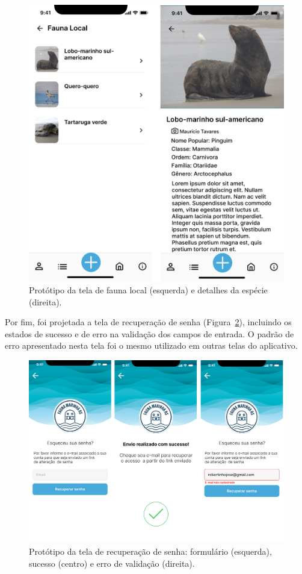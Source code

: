 \begin{figure}[H]
    \centering
    \includegraphics[height=0.6\textheight]{imagens/fauna-local-figma.png}
    \caption{Protótipo da tela de fauna local (esquerda) e detalhes da espécie (direita).}
    \label{fig:prototipo-fauna-local}
\end{figure}

Por fim, foi projetada a tela de recuperação de senha (Figura~\ref{fig:prototipo-esqueci-senha}), 
incluindo os estados de sucesso e de erro na validação dos campos de entrada. O padrão de erro 
apresentado nesta tela foi o mesmo utilizado em outras telas do aplicativo.

\begin{figure}[H]
    \centering
    \includegraphics[height=0.53\textheight, width=\textwidth]{imagens/esqueceu-senha-figma.png}
    \caption{Protótipo da tela de recuperação de senha: formulário (esquerda), sucesso (centro) e erro de 
    validação (direita).}
    \label{fig:prototipo-esqueci-senha}
\end{figure}

